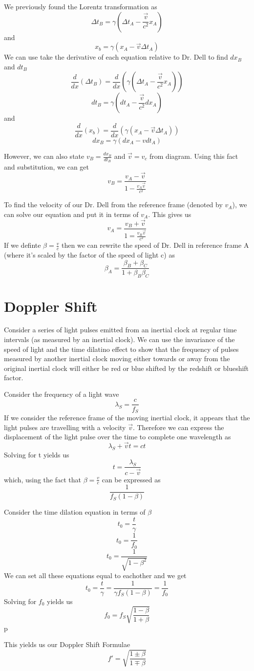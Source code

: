 \documentclass{article}
\begin{document}
We previously found the Lorentz transformation as
\[
  \Delta t_B = \gamma (\Delta t_A - \frac{\vec{v}}{c^2} x_A)
\]
and
\[
  x_b = \gamma (x_A - \vec{v} \Delta t_A)
\]
We can use take the derivative of each equation relative to Dr. Dell to find \(dx_B\) and \(dt_B\)
\[
  \frac{d}{dx}(\Delta t_B) = \frac{d}{dx}(\gamma (\Delta t_A - \frac{\vec{v}}{c^2} x_A))
\]
\[
  dt_B = \gamma (dt_A - \frac{\vec{v}}{c^2} dx_A)
\]
and
\[
  \frac{d}{dx}(x_b) = \frac{d}{dx}(\gamma (x_A - \vec{v} \Delta t_A))
\]
\[
  dx_B = \gamma (dx_A - vdt_A)
\]

However, we can also state \(v_B = \frac{dx_B}{dt_B}\) and \(\vec{v} = v_c\) from diagram. Using this fact and substitution, we can get
\[
  v_B = \frac{v_A - \vec{v}}{1 - \frac{v_A \vec{v}}{c^2}}
\]

To find the velocity of our Dr. Dell from the reference frame (denoted by \(v_A\)), we can solve our equation and put it in terms of \(v_A\). This gives us
\[
  v_A = \frac{v_B + \vec{v}}{1 = \frac{v_B \vec{v}}{c^2}}
\]
If we definte \(\beta = \frac{v}{c}\) then we can rewrite the speed of Dr. Dell in reference frame A (where it's scaled by the factor of the speed of light c) as
\[
\beta_A = \frac{\beta_B + \beta_C}{1 + \beta_B \beta_C}
\]
\newpage
\section{Doppler Shift}
Consider a series of light pulses emitted from an inertial clock at regular time intervals (as measured by an inertial clock). We can use the invariance of the speed of light and the time dilatino effect to show that the frequency of pulses measured by another inertial clock moving either towards or away from the original inertial clock will either be red or blue shifted by the redshift or blueshift factor.

Consider the frequency of a light wave
\[
  \lambda_S = \frac{c}{f_S}
\]
If we consider the reference frame of the moving inertial clock, it appears that the light pulses are travelling with a velocity \(\vec{v}\). Therefore we can express the displacement of the light pulse over the time to complete one wavelength as
\[
  \lambda_S + \vec{v}t = ct
\]
Solving for t yields us
\[
  t = \frac{\lambda_S}{c - \vec{v}}
\]
which, using the fact that \(\beta =  \frac{v}{c}\) can be expressed as
\[
  \frac{1}{f_S (1 - \beta)}
\]

Consider the time dilation equation in terms of \(\beta\)
\[
  t_0 = \frac{t}{\gamma}
\]
\[
  t_0 = \frac{1}{f_0}
\]
\[
  t_0 = \frac{1}{\sqrt{1 - \beta^2}}
\]
We can set all these equations equal to eachother and we get
\[
  t_0 = \frac{t}{\gamma} = \frac{1}{\gamma f_S (1-\beta)} = \frac{1}{f_0}
\]
Solving for \(f_0\) yields us
\[
  f_0 = f_S \sqrt{\frac{1 - \beta}{1 + \beta}}
\]p

This yields us our Doppler Shift Formulae
\[
  f' = \sqrt{\frac{1 \pm \beta}{1 \mp \beta}}
\]
\end{document}

